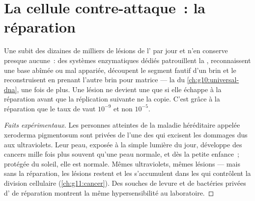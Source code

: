 \section{La cellule contre-attaque~: la réparation}

\begin{proposition}\label{prop:g11:mutations:repair}
Une  subit des dizaines de milliers de lésions de l' par jour
et n'en conserve presque aucune~: des systèmes enzymatiques dédiés
patrouillent la , reconnaissent une base abîmée ou mal
appariée, découpent le segment fautif d'un brin et le reconstruisent en
prenant l'autre brin pour matrice --- la  du
\cref{ch:g10:universal-dna}, une fois de plus. Une lésion ne devient
une  que si elle échappe à la réparation avant que la
réplication suivante ne la copie. C'est grâce à la réparation que le
taux de  vaut $10^{-9}$ et non $10^{-5}$.
\end{proposition}
\begin{proof}[Faits expérimentaux]
Les personnes atteintes de la maladie héréditaire appelée xeroderma
pigmentosum sont privées de l'une des  qui excisent les dommages
dus aux ultraviolets. Leur peau, exposée à la
simple lumière du jour, développe des cancers mille fois plus souvent
qu'une peau normale, et dès la petite enfance~; protégée du soleil,
elle est normale. Mêmes ultraviolets, mêmes lésions --- mais sans la
réparation, les lésions restent et les  s'accumulent dans les
 qui contrôlent la division cellulaire (\cref{ch:g11:cancer}). Des
souches de levure et de bactéries privées d' de réparation
montrent la même hypersensibilité au laboratoire.
\end{proof}

